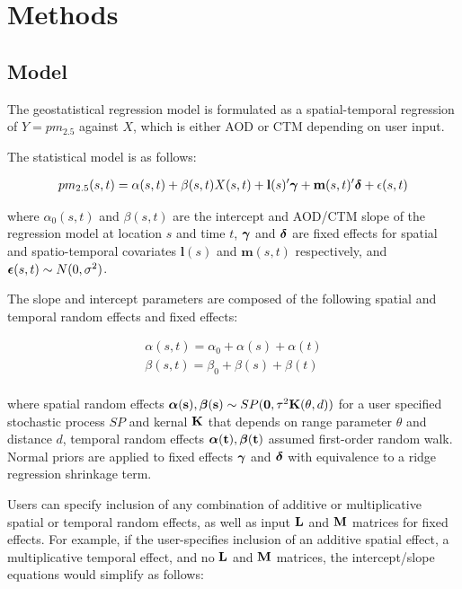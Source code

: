 
\section*{Methods}

\subsection*{Model}

The geostatistical regression model is formulated as a spatial-temporal regression of $Y = pm_{2.5}$ against $X$, which is either AOD or CTM depending on user input. 

The statistical model is as follows:

\begin{align*} 
    pm_{2.5}(s,t) = \alpha(s, t) + \beta(s, t) X(s, t) + \mathbf{l}(s)' \boldsymbol{\gamma} +  \mathbf{m}(s, t)' \boldsymbol{\delta} + \epsilon(s, t)
\end{align*}
         
where $\alpha_0(s, t)$ and $\beta(s, t)$ are the intercept and AOD/CTM slope of the regression model at location $s$ and time $t$, $\boldsymbol{\gamma}$ and $\boldsymbol{\delta}$ are fixed effects for spatial and spatio-temporal covariates $\mathbf{l}(s)$ and $\mathbf{m}(s, t)$ respectively, and $\boldsymbol{\epsilon}(s, t) \sim N(0, \sigma^2)$. 

The slope and intercept parameters are composed of the following spatial and temporal random effects and fixed effects:

\begin{align*}
    \alpha(s, t) = \alpha_0 + \alpha(s) + \alpha(t) \\
    \beta(s, t) = \beta_0 + \beta(s) + \beta(t) \\
\end{align*} 

where spatial random effects $\boldsymbol{\alpha}(\mathbf{s}), \boldsymbol{\beta}(\mathbf{s}) \sim SP(\mathbf{0}, \tau^2 \mathbf{K}(\theta, d))$ for a user specified stochastic process $SP$ and kernal $\mathbf{K}$ that depends on range parameter $\theta$ and distance $d$, temporal random effects $\boldsymbol{\alpha}(\mathbf{t}), \boldsymbol{\beta}(\mathbf{t})$ assumed first-order random walk.
 Normal priors are applied to fixed effects $\boldsymbol{\gamma}$ and $\boldsymbol{\delta}$ with equivalence to a ridge regression shrinkage term. 

Users can specify inclusion of any combination of additive or multiplicative spatial or temporal random effects, as well as input $\mathbf{L}$ and $\mathbf{M}$ matrices for fixed effects.
For example, if the user-specifies inclusion of an additive spatial effect, a multiplicative temporal effect, and no $\mathbf{L}$ and $\mathbf{M}$ matrices, the intercept/slope equations would simplify as follows:

